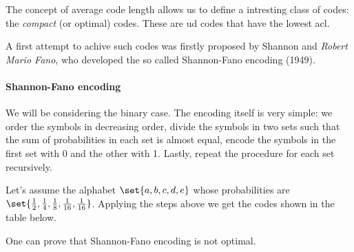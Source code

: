 \documentclass{subfiles}
\begin{document}
    The concept of average code length allows us to define a intresting class of 
        codes: the \emph{compact} (or optimal) codes.
        These are \gls{ud} codes that have the lowest \gls{acl}.
    
    A first attempt to achive such codes was firstly proposed by Shannon 
        and \emph{Robert Mario Fano}, who developed the so called Shannon-Fano 
        encoding (1949).

    \paragraph{Shannon-Fano encoding}
    We will be considering the binary case. 
    The encoding itself is very simple: we order the symbols in decreasing order,
    divide the symbols in two sets such that the sum of probabilities in each set 
    is almost equal, encode the symbols in the first set with 0 and the other with 1.
    Lastly, repeat the procedure for each set recursively.
    \begin{example*}
        Let's assume the alphabet \(\set{a, b, c, d, e}\) whose probabilities are
            \(\set{\tfrac{1}{2}, \tfrac{1}{4}, \tfrac{1}{8},
                \tfrac{1}{16}, \tfrac{1}{16}}\). 
            Applying the steps above we get the codes shown in the table below. 
            
    \end{example*}
    One can prove that Shannon-Fano encoding is not optimal.
    \clearpage
\end{document}
